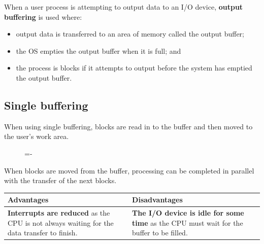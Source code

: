 \documentclass[a4paper]{systems-software}
\begin{document}
When a user process is attempting to output data to an I/O device, \textbf{output buffering} is used where:
\begin{itemize}
	\item output data is transferred to an area of memory called the output buffer;
	\item the OS empties the output buffer when it is full; and
	\item the process is blocks if it attempts to output before the system has emptied the output buffer.
\end{itemize}


\newpage

\subsection*{Single buffering}

When using single buffering, blocks are read in to the buffer and then moved to the user's work area.

\begin{figure}[H]
  \lineskip=-\fboxrule
\end{figure}

When blocks are moved from the buffer, processing can be completed in parallel with the transfer of the next blocks.

\begin{longtabu} to \textwidth {| X[1,l] | X[1,l] |}
    \hline
    \textbf{Advantages} & \textbf{Disadvantages}
	\\ \hline
	\textbf{Interrupts are reduced} as the CPU is not always waiting for the data transfer to finish. &
	\textbf{The I/O device is idle for some time} as the CPU must wait for the buffer to be filled.
	\\ \hline
\end{longtabu}
\end{document}
